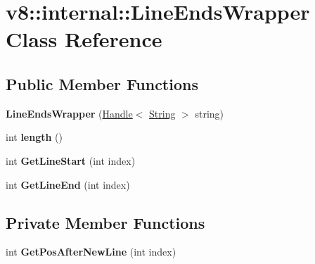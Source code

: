 \hypertarget{classv8_1_1internal_1_1_line_ends_wrapper}{}\section{v8\+:\+:internal\+:\+:Line\+Ends\+Wrapper Class Reference}
\label{classv8_1_1internal_1_1_line_ends_wrapper}
\subsection*{Public Member Functions}
\begin{DoxyCompactItemize}
\item 
{\bfseries Line\+Ends\+Wrapper} (\hyperlink{classv8_1_1internal_1_1_handle}{Handle}$<$ \hyperlink{classv8_1_1internal_1_1_string}{String} $>$ string)\hypertarget{classv8_1_1internal_1_1_line_ends_wrapper_af87075f1b0bb1fea96f1a0c2b281fb3b}{}\label{classv8_1_1internal_1_1_line_ends_wrapper_af87075f1b0bb1fea96f1a0c2b281fb3b}

\item 
int {\bfseries length} ()\hypertarget{classv8_1_1internal_1_1_line_ends_wrapper_a4f4f4f81a273062344279f197fe103a6}{}\label{classv8_1_1internal_1_1_line_ends_wrapper_a4f4f4f81a273062344279f197fe103a6}

\item 
int {\bfseries Get\+Line\+Start} (int index)\hypertarget{classv8_1_1internal_1_1_line_ends_wrapper_a61703dd03610aaa95d683c63eb8f214a}{}\label{classv8_1_1internal_1_1_line_ends_wrapper_a61703dd03610aaa95d683c63eb8f214a}

\item 
int {\bfseries Get\+Line\+End} (int index)\hypertarget{classv8_1_1internal_1_1_line_ends_wrapper_a83e4cb4c6a06eea674dc9bf3743131ad}{}\label{classv8_1_1internal_1_1_line_ends_wrapper_a83e4cb4c6a06eea674dc9bf3743131ad}

\end{DoxyCompactItemize}
\subsection*{Private Member Functions}
\begin{DoxyCompactItemize}
\item 
int {\bfseries Get\+Pos\+After\+New\+Line} (int index)\hypertarget{classv8_1_1internal_1_1_line_ends_wrapper_acbaba2776e35ab5a47f939c14e328451}{}\label{classv8_1_1internal_1_1_line_ends_wrapper_acbaba2776e35ab5a47f939c14e328451}

\end{DoxyCompactItemize}

